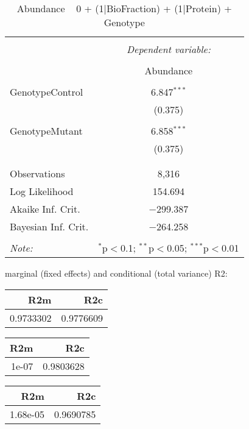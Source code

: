 \documentclass[11pt]{report}
\begin{document}
\begin{table}[!htbp] \centering 
  \caption{Abundance ~ 0 + (1|BioFraction) + (1|Protein) + Genotype} 
  \label{} 
\begin{tabular}{@{\extracolsep{5pt}}lc} 
\\[-1.8ex]\hline 
\hline \\[-1.8ex] 
 & \multicolumn{1}{c}{\textit{Dependent variable:}} \\ 
\cline{2-2} 
\\[-1.8ex] & Abundance \\ 
\hline \\[-1.8ex] 
 GenotypeControl & 6.847$^{***}$ \\ 
  & (0.375) \\ 
  & \\ 
 GenotypeMutant & 6.858$^{***}$ \\ 
  & (0.375) \\ 
  & \\ 
\hline \\[-1.8ex] 
Observations & 8,316 \\ 
Log Likelihood & 154.694 \\ 
Akaike Inf. Crit. & $-$299.387 \\ 
Bayesian Inf. Crit. & $-$264.258 \\ 
\hline 
\hline \\[-1.8ex] 
\textit{Note:}  & \multicolumn{1}{r}{$^{*}$p$<$0.1; $^{**}$p$<$0.05; $^{***}$p$<$0.01} \\ 
\end{tabular} 
\end{table} 
marginal (fixed effects) and conditional (total variance) R2:

\begin{tabular}{r|r}
\hline
R2m & R2c\\
\hline
0.9733302 & 0.9776609\\
\hline
\end{tabular}

\begin{tabular}{r|r}
\hline
R2m & R2c\\
\hline
1e-07 & 0.9803628\\
\hline
\end{tabular}

\begin{tabular}{r|r}
\hline
R2m & R2c\\
\hline
1.68e-05 & 0.9690785\\
\hline
\end{tabular}
\end{document}
